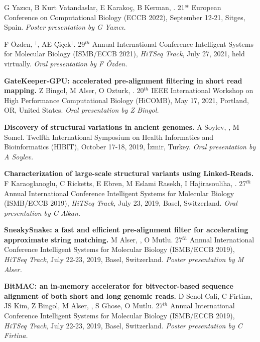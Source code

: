 \vspace{-.2cm}{\bf Identification of protein-protein interaction
bridges in multiple sclerosis.} G Yazıcı, B Kurt Vatandaslar, E Karakoç, B Kerman, \calkan{}.
21$^{st}$ European Conference on Computational Biology (ECCB 2022), September 12-21, Sitges, Spain. 
{\it Poster presentation by G Yazıcı.}

\vspace{-.2cm}{\bf Polishing copy number variant calls on exome sequencing data via deep learning.}
F Özden, \calkan{}$^\ddag$, AE Çiçek$^\ddag$. 29$^{th}$ Annual
International Conference Intelligent Systems for Molecular Biology (ISMB/ECCB 2021), {\em HiTSeq Track},
 July 27, 2021, held virtually. {\it Oral presentation by F Özden.}


\vspace{-.2cm}
{\bf GateKeeper-GPU: accelerated pre-alignment filtering in short read mapping.} Z Bingol, M Alser, O Ozturk, \calkan{}. 20$^{th}$ IEEE International Workshop on High Performance Computational Biology (HiCOMB), May 17, 2021, Portland, OR, United States.
{\it Oral presentation by Z Bingol.}


\clearpage

\vspace{-.2cm}
{\bf Discovery of structural variations in ancient genomes.}
A Soylev, \calkan{}, M Somel. 
Twelfth International Symposium on Health Informatics and Bioinformatics (HIBIT), October 17-18, 2019, İzmir, Turkey.
       {\it Oral presentation by A Soylev.}

       
       
\vspace{-.2cm}
  {\bf Characterization of large-scale structural variants using Linked-Reads.}
  F Karaoglanoglu, C Ricketts, E Ebren, M Eslami Rasekh, I Hajirasouliha, \calkan{}.
27$^{th}$ Annual
International Conference Intelligent Systems for Molecular Biology (ISMB/ECCB 2019), {\em HiTSeq Track},
 July 23, 2019, Basel, Switzerland. {\it Oral presentation by C Alkan.}




\vspace{-.2cm}
  {\bf SneakySnake: a fast and efficient pre-alignment filter for accelerating approximate string matching.}
  M Alser, \calkan{}, O Mutlu.
27$^{th}$ Annual
International Conference Intelligent Systems for Molecular Biology (ISMB/ECCB 2019), {\em HiTSeq Track},
 July 22-23, 2019, Basel, Switzerland. {\it Poster presentation by M Alser.}

\vspace{-.2cm}
   {\bf BitMAC: an in-memory accelerator for bitvector-based sequence alignment of both
short and long genomic reads.}
  D Senol Cali, C Firtina, JS Kim, Z Bingol, M Alser, \calkan{},
S Ghose, O Mutlu.
27$^{th}$ Annual
International Conference Intelligent Systems for Molecular Biology (ISMB/ECCB 2019), {\em HiTSeq Track},
 July 22-23, 2019, Basel, Switzerland. {\it Poster presentation by C Firtina.}

